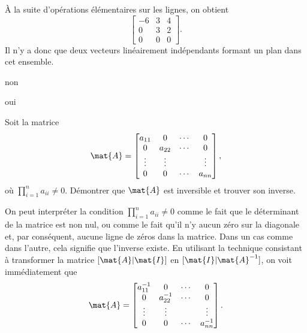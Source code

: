 \begin{exercice}
\begin{sol}
\begin{enumerate}
      À la suite d'opérations élémentaires sur les lignes, on obtient
      \begin{displaymath}
        \begin{bmatrix}
          -6 & 3 & 4 \\ 0 & 3 & 2 \\ 0 & 0 & 0
        \end{bmatrix}.
      \end{displaymath}
      Il n'y a donc que deux vecteurs linéairement indépendants
      formant un plan dans cet ensemble.
    \end{enumerate}
  \end{sol}
  \begin{rep}
    \begin{inparaenum}
    \item non
    \item oui
    \end{inparaenum}
  \end{rep}
\end{exercice}

\begin{exercice}
  \label{ex:revision:inverse_diagonale}
  Soit la matrice
  \begin{displaymath}
    \mat{A} =
    \begin{bmatrix}
      a_{11} &      0 & \cdots &      0 \\
           0 & a_{22} & \cdots &      0 \\
      \vdots & \vdots &        & \vdots \\
           0 &      0 & \cdots & a_{nn}
    \end{bmatrix},
  \end{displaymath}
  où $\prod_{i=1}^n a_{ii} \neq 0$. Démontrer que $\mat{A}$ est
  inversible et trouver son inverse.
  \begin{sol}
    On peut interpréter la condition $\prod_{i=1}^n a_{ii} \neq 0$
    comme le fait que le déterminant de la matrice est non nul, ou
    comme le fait qu'il n'y aucun zéro sur la diagonale et, par
    conséquent, aucune ligne de zéros dans la matrice. Dans un cas
    comme dans l'autre, cela signifie que l'inverse existe. En
    utilisant la technique consistant à transformer la matrice
    $[\mat{A}|\mat{I}]$ en $[\mat{I}|\mat{A}^{-1}]$, on voit
    immédiatement que
    \begin{displaymath}
      \mat{A} =
      \begin{bmatrix}
        a_{11}^{-1} &          0 & \cdots &      0 \\
                 0 & a_{22}^{-1} & \cdots &      0 \\
            \vdots &     \vdots &        & \vdots \\
                 0 &          0 & \cdots & a_{nn}^{-1}
      \end{bmatrix}.
    \end{displaymath}
  \end{sol}
\end{exercice}

